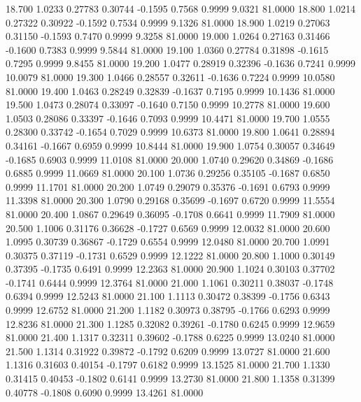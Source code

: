   18.700   1.0233   0.27783   0.30744  -0.1595   0.7568   0.9999   9.0321  81.0000
  18.800   1.0214   0.27322   0.30922  -0.1592   0.7534   0.9999   9.1326  81.0000
  18.900   1.0219   0.27063   0.31150  -0.1593   0.7470   0.9999   9.3258  81.0000
  19.000   1.0264   0.27163   0.31466  -0.1600   0.7383   0.9999   9.5844  81.0000
  19.100   1.0360   0.27784   0.31898  -0.1615   0.7295   0.9999   9.8455  81.0000
  19.200   1.0477   0.28919   0.32396  -0.1636   0.7241   0.9999  10.0079  81.0000
  19.300   1.0466   0.28557   0.32611  -0.1636   0.7224   0.9999  10.0580  81.0000
  19.400   1.0463   0.28249   0.32839  -0.1637   0.7195   0.9999  10.1436  81.0000
  19.500   1.0473   0.28074   0.33097  -0.1640   0.7150   0.9999  10.2778  81.0000
  19.600   1.0503   0.28086   0.33397  -0.1646   0.7093   0.9999  10.4471  81.0000
  19.700   1.0555   0.28300   0.33742  -0.1654   0.7029   0.9999  10.6373  81.0000
  19.800   1.0641   0.28894   0.34161  -0.1667   0.6959   0.9999  10.8444  81.0000
  19.900   1.0754   0.30057   0.34649  -0.1685   0.6903   0.9999  11.0108  81.0000
  20.000   1.0740   0.29620   0.34869  -0.1686   0.6885   0.9999  11.0669  81.0000
  20.100   1.0736   0.29256   0.35105  -0.1687   0.6850   0.9999  11.1701  81.0000
  20.200   1.0749   0.29079   0.35376  -0.1691   0.6793   0.9999  11.3398  81.0000
  20.300   1.0790   0.29168   0.35699  -0.1697   0.6720   0.9999  11.5554  81.0000
  20.400   1.0867   0.29649   0.36095  -0.1708   0.6641   0.9999  11.7909  81.0000
  20.500   1.1006   0.31176   0.36628  -0.1727   0.6569   0.9999  12.0032  81.0000
  20.600   1.0995   0.30739   0.36867  -0.1729   0.6554   0.9999  12.0480  81.0000
  20.700   1.0991   0.30375   0.37119  -0.1731   0.6529   0.9999  12.1222  81.0000
  20.800   1.1000   0.30149   0.37395  -0.1735   0.6491   0.9999  12.2363  81.0000
  20.900   1.1024   0.30103   0.37702  -0.1741   0.6444   0.9999  12.3764  81.0000
  21.000   1.1061   0.30211   0.38037  -0.1748   0.6394   0.9999  12.5243  81.0000
  21.100   1.1113   0.30472   0.38399  -0.1756   0.6343   0.9999  12.6752  81.0000
  21.200   1.1182   0.30973   0.38795  -0.1766   0.6293   0.9999  12.8236  81.0000
  21.300   1.1285   0.32082   0.39261  -0.1780   0.6245   0.9999  12.9659  81.0000
  21.400   1.1317   0.32311   0.39602  -0.1788   0.6225   0.9999  13.0240  81.0000
  21.500   1.1314   0.31922   0.39872  -0.1792   0.6209   0.9999  13.0727  81.0000
  21.600   1.1316   0.31603   0.40154  -0.1797   0.6182   0.9999  13.1525  81.0000
  21.700   1.1330   0.31415   0.40453  -0.1802   0.6141   0.9999  13.2730  81.0000
  21.800   1.1358   0.31399   0.40778  -0.1808   0.6090   0.9999  13.4261  81.0000
